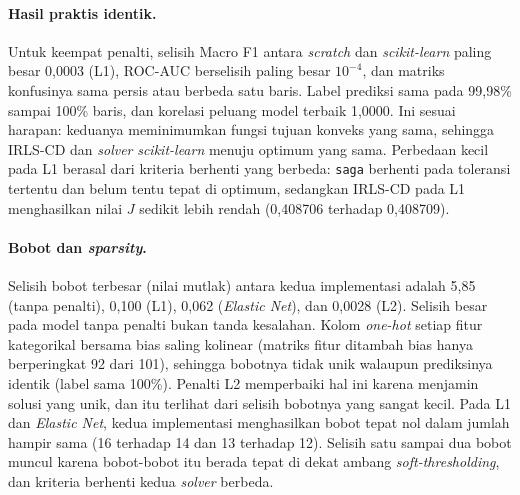 \paragraph{Hasil praktis identik.} Untuk keempat penalti, selisih Macro F1 antara \textit{scratch} dan \textit{scikit-learn} paling besar 0,0003 (L1), ROC-AUC berselisih paling besar $10^{-4}$, dan matriks konfusinya sama persis atau berbeda satu baris. Label prediksi sama pada 99,98\% sampai 100\% baris, dan korelasi peluang model terbaik 1,0000. Ini sesuai harapan: keduanya meminimumkan fungsi tujuan konveks yang sama, sehingga IRLS-CD dan \textit{solver} \textit{scikit-learn} menuju optimum yang sama. Perbedaan kecil pada L1 berasal dari kriteria berhenti yang berbeda: \texttt{saga} berhenti pada toleransi tertentu dan belum tentu tepat di optimum, sedangkan IRLS-CD pada L1 menghasilkan nilai $J$ sedikit lebih rendah (0,408706 terhadap 0,408709).

\paragraph{Bobot dan \textit{sparsity}.} Selisih bobot terbesar (nilai mutlak) antara kedua implementasi adalah 5,85 (tanpa penalti), 0,100 (L1), 0,062 (\textit{Elastic Net}), dan 0,0028 (L2). Selisih besar pada model tanpa penalti bukan tanda kesalahan. Kolom \textit{one-hot} setiap fitur kategorikal bersama bias saling kolinear (matriks fitur ditambah bias hanya berperingkat 92 dari 101), sehingga bobotnya tidak unik walaupun prediksinya identik (label sama 100\%). Penalti L2 memperbaiki hal ini karena menjamin solusi yang unik, dan itu terlihat dari selisih bobotnya yang sangat kecil. Pada L1 dan \textit{Elastic Net}, kedua implementasi menghasilkan bobot tepat nol dalam jumlah hampir sama (16 terhadap 14 dan 13 terhadap 12). Selisih satu sampai dua bobot muncul karena bobot-bobot itu berada tepat di dekat ambang \textit{soft-thresholding}, dan kriteria berhenti kedua \textit{solver} berbeda.


